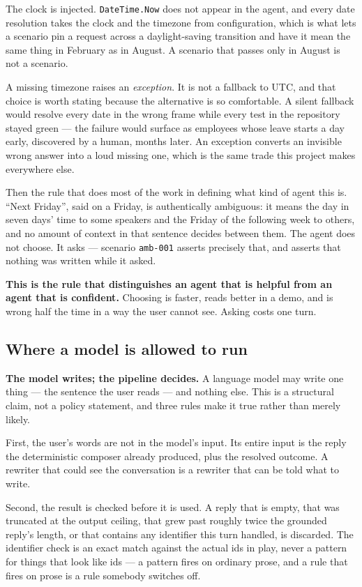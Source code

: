 \documentclass[11pt,a4paper]{article}
\newcommand{\finding}[1]{{\color{primaryblue}\textbf{#1}}}
\begin{document}
The clock is injected. \texttt{DateTime.Now} does not appear in the agent, and
every date resolution takes the clock and the timezone from configuration, which
is what lets a scenario pin a request across a daylight-saving transition and
have it mean the same thing in February as in August. A scenario that passes only
in August is not a scenario.

A missing timezone raises an \emph{exception}. It is not a fallback to UTC, and
that choice is worth stating because the alternative is so comfortable. A silent
fallback would resolve every date in the wrong frame while every test in the
repository stayed green --- the failure would surface as employees whose leave
starts a day early, discovered by a human, months later. An exception converts an
invisible wrong answer into a loud missing one, which is the same trade this
project makes everywhere else.

Then the rule that does most of the work in defining what kind of agent this is.
``Next Friday'', said on a Friday, is authentically ambiguous: it means the day
in seven days' time to some speakers and the Friday of the following week to
others, and no amount of context in that sentence decides between them. The agent
does not choose. It asks --- scenario \texttt{amb-001} asserts precisely that, and
asserts that nothing was written while it asked.

\finding{This is the rule that distinguishes an agent that is helpful from an
agent that is confident.} Choosing is faster, reads better in a demo, and is
wrong half the time in a way the user cannot see. Asking costs one turn.

\subsection{Where a model is allowed to run}

\finding{The model writes; the pipeline decides.} A language model may write one
thing --- the sentence the user reads --- and nothing else. This is a structural
claim, not a policy statement, and three rules make it true rather than merely
likely.

First, the user's words are not in the model's input. Its entire input is the
reply the deterministic composer already produced, plus the resolved outcome. A
rewriter that could see the conversation is a rewriter that can be told what to
write.

Second, the result is checked before it is used. A reply that is empty, that was
truncated at the output ceiling, that grew past roughly twice the grounded
reply's length, or that contains any identifier this turn handled, is discarded.
The identifier check is an exact match against the actual ids in play, never a
pattern for things that look like ids --- a pattern fires on ordinary prose, and a
rule that fires on prose is a rule somebody switches off.
\end{document}
